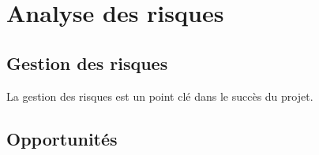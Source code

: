 \chapter*{Analyse des risques}
\label{sec:risques}
\section*{Gestion des risques}
La gestion des risques est un point clé dans le succès du projet.

\section*{Opportunités}

